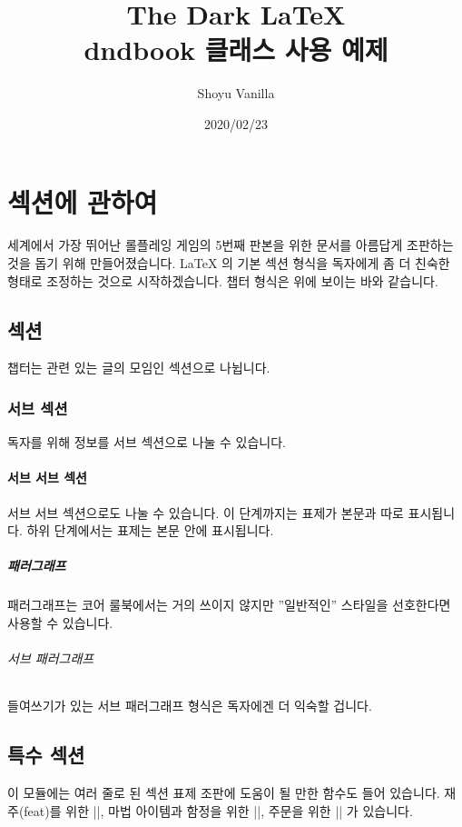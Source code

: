 \documentclass[letterpaper,twocolumn,openany,nodeprecatedcode]{dndbook}
\title{The Dark \LaTeX{} \\
\large dndbook 클래스 사용 예제}
\author{Shoyu Vanilla}
\date{2020/02/23}
\begin{document}
\frontmatter

\maketitle

\tableofcontents

\mainmatter%

\chapter{섹션에 관하여}

 세계에서 가장 뛰어난 롤플레잉 게임의 5번째 판본을 위한 문서를 아름답게 조판하는 것을 돕기 위해 만들어졌습니다. \LaTeX{} 의 기본 섹션 형식을 독자에게 좀 더 친숙한 형태로 조정하는 것으로 시작하겠습니다. 챕터 형식은 위에 보이는 바와 같습니다.


\section{섹션}
챕터는 관련 있는 글의 모임인 섹션으로 나뉩니다.

\subsection{서브 섹션}
독자를 위해 정보를 서브 섹션으로 나눌 수 있습니다.

\subsubsection{서브 서브 섹션}
서브 서브 섹션으로도 나눌 수 있습니다. 이 단계까지는 표제가 본문과 따로 표시됩니다. 하위 단계에서는 표제는 본문 안에 표시됩니다.

\paragraph{패러그래프}
패러그래프는 코어 룰북에서는 거의 쓰이지 않지만 ''일반적인'' 스타일을 선호한다면 사용할 수 있습니다.

\subparagraph{서브 패러그래프}
들여쓰기가 있는 서브 패러그래프 형식은 독자에겐 더 익숙할 겁니다.

\section{특수 섹션}
이 모듈에는 여러 줄로 된 섹션 표제 조판에 도움이 될 만한 함수도 들어 있습니다. 재주(feat)를 위한 |\DndFeatHeader|, 마법 아이템과 함정을 위한 |\DndItemHeader|, 주문을 위한 |\DndSpellHeader| 가 있습니다.
\end{document}
